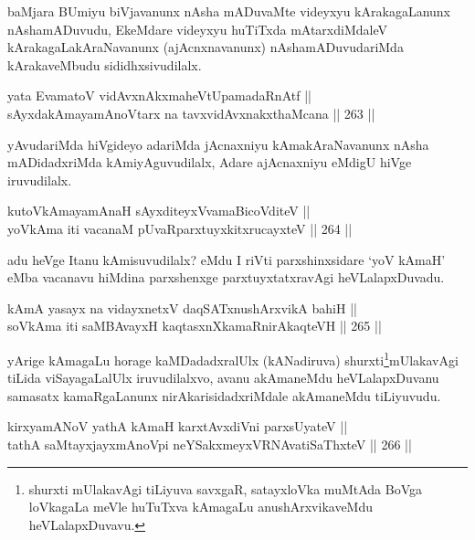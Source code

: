 \begin{artha}
baMjara BUmiyu biVjavanunx nAsha mADuvaMte videyxyu kArakagaLanunx
nAshamADuvudu, EkeMdare videyxyu huTiTxda mAtarxdiMdaleV
kArakagaLakAraNavanunx (ajAcnxnavanunx) nAshamADuvudariMda
kArakaveMbudu sididhxsivudilalx.
\end{artha}

\begin{shl}
yata EvamatoV vidAvxnAkxmaheVtUpamadaRnAtf || \\
sAyxdakAmayamAnoV\s tarx na tavxvidAvxnakxthaMcana \hfill || 263 ||  
\end{shl}

\begin{artha}
yAvudariMda hiVgideyo adariMda jAcnaxniyu kAmakAraNavanunx nAsha mADidadxriMda kAmiyAguvudilalx, Adare ajAcnaxniyu eMdigU hiVge iruvudilalx.
\end{artha}

\begin{shl}
kutoV\s kAmayamAnaH sAyxditeyxVvamaBicoVditeV || \\
yoV\s kAma iti vacanaM pUvaRparxtuyxkitxrucayxteV \hfill || 264 ||  
\end{shl}

\begin{artha}
adu heVge Itanu kAmisuvudilalx? eMdu I riVti parxshinxsidare `yoV\s
kAmaH' eMba vacanavu hiMdina parxshenxge parxtuyxtatxravAgi heVLalapxDuvadu.
\end{artha}


\begin{shl}
kAmA yasayx na vidayxnetxV daqSATxnushArxvikA bahiH || \\
soV\s kAma iti saMBAvayxH kaqtasxnXkamaRnirAkaqteVH \hfill || 265 ||   
\end{shl}

\begin{artha}
yArige kAmagaLu horage kaMDadadxralUlx (kANadiruva) shurxti\footnote{shurxti mUlakavAgi tiLiyuva savxgaR, satayxloVka muMtAda
BoVga loVkagaLa meVle huTuTxva kAmagaLu anushArxvikaveMdu
heVLalapxDuvavu.}mUlakavAgi tiLida viSayagaLalUlx iruvudilalxvo, avanu akAmaneMdu
heVLalapxDuvanu samasatx kamaRgaLanunx nirAkarisidadxriMdale
akAmaneMdu tiLiyuvudu.
\end{artha}

\begin{shl}
kirxyamANoV yathA kAmaH karxtAvxdiVni parxsUyateV || \\
tathA saMtayxjayxmAnoV\s pi neYSakxmeyxVRNAvatiSaThxteV \hfill || 266 ||  
\end{shl}

